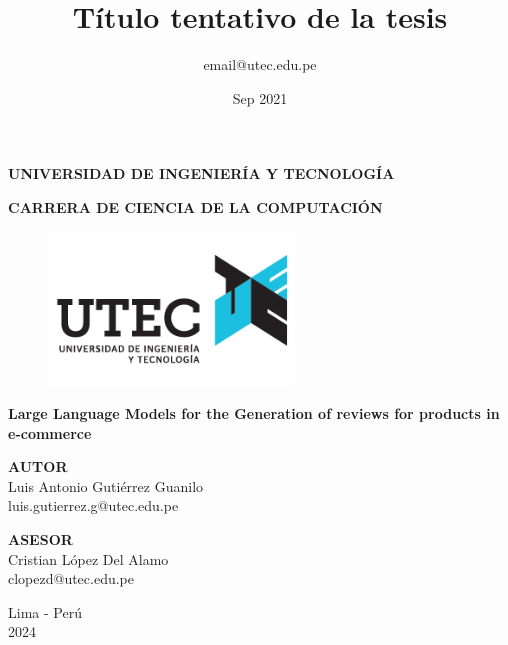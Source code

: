 \documentclass{report}
\title{Título tentativo de la tesis}
\author{email@utec.edu.pe}
\date{Sep 2021}
\begin{document}
\begin{titlepage}
    \begin{center}
        \Large
        \textbf{UNIVERSIDAD DE INGENIERÍA Y TECNOLOGÍA}
        \vspace*{0.9cm}

        \large
        \textbf{CARRERA DE CIENCIA DE LA COMPUTACIÓN}
        \vspace*{0.9cm}

        \begin{figure}[htbp]
            \centering
            \includegraphics[width=6.5cm,height=\textheight,keepaspectratio]{images/logo}
        \end{figure}

        \LARGE
        \textbf{Large Language Models for the Generation of reviews for products in e-commerce}

        \vspace{0.9cm}
        \Large


        \textbf{AUTOR}
        \vspace{0.5cm}
        \\Luis Antonio Guti\'errez Guanilo
        \\luis.gutierrez.g@utec.edu.pe
        \vfill

        \vspace{1.0cm}

        \textbf{ASESOR}
        \vspace{0.5cm}
        \\Cristian López Del Alamo
        \\clopezd@utec.edu.pe
        \vfill
        \vspace{0.8cm}
        \Large

        Lima - Perú
        \\
        2024

    \end{center}
\end{titlepage}
\end{document}
